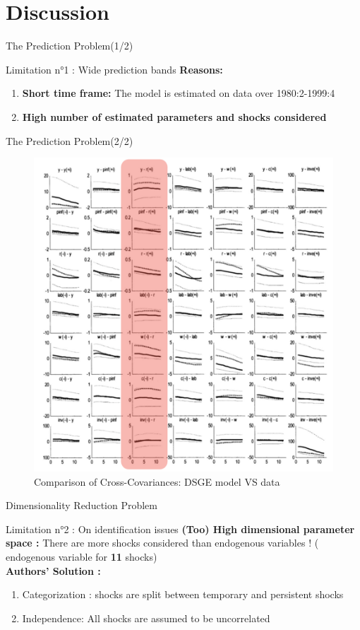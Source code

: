 \documentclass{beamer}
\begin{document}
\section{Discussion}

\begin{frame}{The Prediction Problem(1/2)}
\begin{simplebox}{Limitation n°1 : Wide prediction bands}
\textbf{Reasons:}
\begin{enumerate}
    \item\textbf{Short time frame:} The model is estimated on data over 1980:2-1999:4
    \item\textbf{High number of estimated parameters and shocks considered} 

\end{enumerate}
\end{simplebox}
\end{frame}

\begin{frame}{The Prediction Problem(2/2)}

\vspace{-0.1cm}  
\begin{figure}  
    \centering  
    \includegraphics[width=0.55\linewidth]{images/cross_var.png}  
    \vspace{-0.4cm}  
    \caption{\small Comparison of Cross-Covariances: DSGE model VS data}  
    \label{fig:enter-label}  
\end{figure}  

\end{frame}   

\begin{frame}{Dimensionality Reduction Problem}
\begin{simplebox}{Limitation n°2 : On identification issues}
\textbf{(Too) High dimensional parameter space :} There are more shocks considered than endogenous variables ! ( endogenous variable for \textbf{11} shocks)
\\ \textbf{Authors' Solution :} 
\begin{enumerate}
    \item Categorization : shocks are split between temporary and persistent shocks
    \item Independence:  All shocks are assumed to be uncorrelated
\end{enumerate}
\end{simplebox}
\end{frame}
\end{document}
